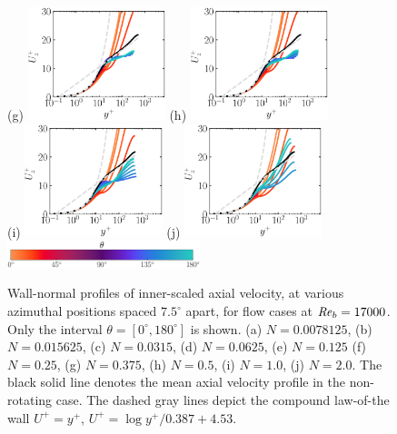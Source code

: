 \documentclass[lineno]{jfm}
\begin{document}
\begin{figure}
                (g) \includegraphics[width=4cm]{Figures/prof_uzplus_rotz0_roty0.1875.eps}
                (h) \includegraphics[width=4cm]{Figures/prof_uzplus_rotz0_roty0.25.eps} \\
                (i) \includegraphics[width=4cm]{Figures/prof_uzplus_rotz0_roty0.5.eps}
                (j) \includegraphics[width=4cm]{Figures/prof_uzplus_rotz0_roty1.0.eps} \\
	    	\includegraphics[width=0.5\textwidth]{Figures/theta_cmap.eps}
    	\caption{
    		Wall-normal profiles of 
    		inner-scaled axial velocity,
    		at various azimuthal positions spaced 
		$7.5^\circ$ apart,
		for flow cases at $\mbox{\textit{Re}}_b=17000$.
		Only the interval $\theta = [0^{\circ},180^{\circ}]$ is shown.
    	        (a) $N = 0.0078125$,
                (b) $N = 0.015625$,
                (c) $N = 0.0315$,
                (d) $N = 0.0625$,
                (e) $N = 0.125$
                (f) $N = 0.25$,
                (g) $N = 0.375$,
                (h) $N = 0.5$,
                (i) $N = 1.0$,
                (j) $N = 2.0$.	
    		The black solid line denotes the mean axial velocity profile in the
    		non-rotating case.
    		The dashed gray lines depict the compound law-of-the wall
    		$U^+=y^+$, $U^+=\log y^+/0.387 + 4.53$.
    	}
		\label{fig:uplus}
	\end{figure}
\end{document}
